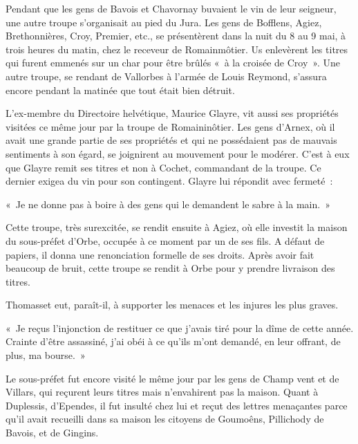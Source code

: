 \documentclass[french,twoside]{book} %
\newenvironment{quoteblock}%
  {\begin{quoting}}
  {\end{quoting}}
\newenvironment{quotebar}{%
    \def\FrameCommand{{\color{rubric!10!}\vrule width 0.5em} \hspace{0.9em}}%
    \def\OuterFrameSep{\itemsep} %
    \MakeFramed {\advance\hsize-\width \FrameRestore}
  }%
  {%
    \endMakeFramed
  }
\renewenvironment{quoteblock}%
  {%
    \savenotes
    \setstretch{0.9}
    \normalfont
    \begin{quotebar}
  }
  {%
    \end{quotebar}
    \spewnotes
  }
\begin{document}
\noindent Pendant que les gens de Bavois et Chavornay buvaient le vin de leur seigneur, une autre troupe s’organisait au pied du Jura. Les gens de Bofflens, Agiez, Brethonnières, Croy, Premier, etc., se présentèrent dans la nuit du 8 au 9 mai, à trois heures du matin, chez le receveur de Romainmôtier. Us enlevèrent les titres qui furent emmenés sur un char pour être brûlés « à la croisée de Croy ». Une autre troupe, se rendant de Vallorbes à l’armée de Louis Reymond, s’assura encore pendant la matinée que tout était bien détruit.\par
L’ex-membre du Directoire helvétique, Maurice Glayre, vit aussi ses propriétés visitées ce même jour par la troupe de Romaininôtier. Les gens d’Arnex, où il avait une grande partie de ses propriétés et qui ne possédaient pas de mauvais sentiments à son égard, se joignirent au mouvement pour le modérer. C’est à eux que Glayre remit ses titres et non à Cochet, commandant de la troupe. Ce dernier exigea du vin pour son contingent. Glayre lui répondit avec fermeté :\par

\begin{quoteblock}
\noindent « Je ne donne pas à boire à des gens qui le demandent le sabre à la main. »\end{quoteblock}

\noindent Cette troupe, très surexcitée, se rendit ensuite à Agiez, où elle investit la maison du sous-préfet d’Orbe, occupée à ce moment par un de ses fils. A défaut de papiers, il donna une renonciation formelle de ses droits. Après avoir fait beaucoup de bruit, cette troupe se rendit à Orbe pour y prendre livraison des titres.\par
Thomasset eut, paraît-il, à supporter les menaces et les injures les plus graves.\par

\begin{quoteblock}
\noindent « Je reçus l’injonction de restituer ce que j’avais tiré pour la dîme de cette année. Crainte d’être assassiné, j’ai obéi à ce qu’ils m’ont demandé, en leur offrant, de plus, ma bourse. »\end{quoteblock}

\noindent Le sous-préfet fut encore visité le même jour par les gens de Champ vent et de Villars, qui reçurent leurs titres mais n’envahirent pas la maison. Quant à Duplessis, d’Ependes, il fut insulté chez lui et reçut des lettres menaçantes parce qu’il avait recueilli dans sa maison les citoyens de Goumoêns, Pillichody de Bavois, et de Gingins.\par
\end{document}
